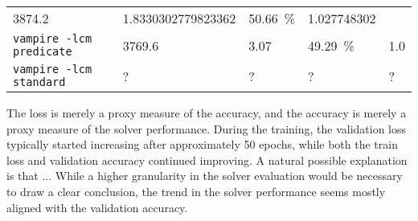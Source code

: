 \begin{table*}
\begin{tabular}{l|ll|ll}
\num{3874.2} &

\num[round-mode=places,round-precision=2]{1.8330302779823362} &

\SI{50.66}{\percent} &

\num[round-mode=places,round-precision=3]{1.027748302} \\


\texttt{vampire -lcm predicate} &

\num{3769.6} &

\num{3.07} &

\SI{49.29}{\percent} &

\num[round-mode=places,round-precision=3]{1.0} \\


\texttt{vampire -lcm standard} & ? & ? & ? & ? \\

\end{tabular}
\end{table*}


The loss is merely a proxy measure of the accuracy,
and the accuracy is merely a proxy measure of the solver performance.
During the training, the validation loss typically started increasing after approximately 50 epochs,
while both the train loss and validation accuracy continued improving.
A natural possible explanation is that ...
While a higher granularity in the solver evaluation would be necessary to draw a clear conclusion,
the trend in the solver performance seems mostly aligned with the validation accuracy.

